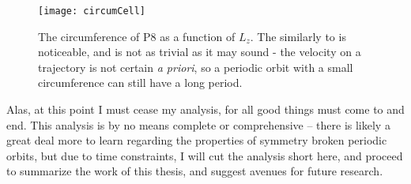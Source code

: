 \begin{figure}[h!]
\texttt{[image: circumCell]}
\caption{The circumference of P8 as a function of $L_z$. The similarly to  is noticeable, and is not as trivial as it may sound - the velocity on a trajectory is not certain \emph{a priori}, so a periodic orbit with a small circumference can still have a long period.}\label{fig:circumCell}
\end{figure}

Alas, at this point I must cease my analysis, for all good things must come to and end. This analysis is by no means complete or comprehensive -- there is likely a great deal more to learn regarding the properties of symmetry broken periodic orbits, but due to time constraints, I will cut the analysis short here, and proceed to summarize the work of this thesis, and suggest avenues for future research. 
